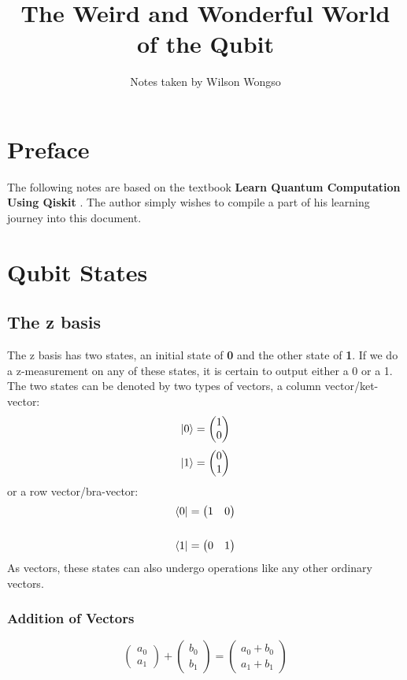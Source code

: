 \documentclass[hidelinks, a4paper, 12pt]{article}
\title{The Weird and Wonderful World of the Qubit}
\author{Notes taken by Wilson Wongso}
\date{}
\newcommand{\bd}{\textbf}
\newcommand{\n}{\\[\baselineskip]}
\begin{document}
    \maketitle
        
    \tableofcontents

    \section{Preface}
        The following notes are based on the textbook \bd{Learn Quantum Computation Using Qiskit} \cite{Qiskit-Textbook}.
        The author simply wishes to compile a part of his learning journey into this document.

    \section{Qubit States}
        \subsection{The z basis}
            The z basis has two states, an initial state of \bd{0} and the other state of \bd{1}.
            If we do a z-measurement on any of these states, it is certain to output either a 0 or a 1.\n
            The two states can be denoted by two types of vectors, a column vector/ket-vector:
            \[\ket{0} = \begin{pmatrix} 1 \\ 0 \end{pmatrix}\]
            \[\ket{1} = \begin{pmatrix} 0 \\ 1 \end{pmatrix}\]
            or a row vector/bra-vector:
            \[\begin{split}
                \bra{0} &= \begin{pmatrix} 1 & 0 \end{pmatrix}\n
                \bra{1} &= \begin{pmatrix} 0 & 1 \end{pmatrix}
            \end{split}\]
            As vectors, these states can also undergo operations like any other ordinary vectors.

            \subsubsection{Addition of Vectors}
                \[\begin{pmatrix} a_0 \\ a_1 \end{pmatrix} + \begin{pmatrix} b_0 \\ b_1 \end{pmatrix} = \begin{pmatrix} a_0 + b_0 \\ a_1 + b_1 \end{pmatrix}\]
\end{document}
